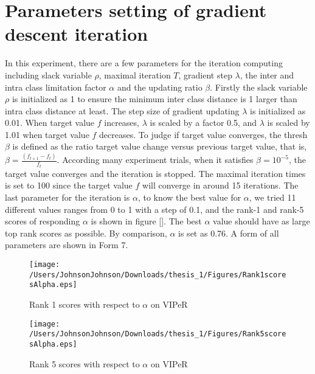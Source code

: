 \section{Parameters setting of gradient descent iteration}
In this experiment, there are a few parameters for the iteration computing including slack variable $\rho$, maximal iteration $T$, gradient step $\lambda$, the inter and intra class limitation factor $\alpha$ and the updating ratio $\beta$. Firstly the slack variable $\rho$ is initialized as 1 to ensure the minimum inter class distance is 1 larger than intra class distance at least. The step size of gradient updating $\lambda$ is initialized as 0.01. When target value $f$ increases,  $\lambda$ is scaled by a factor 0.5, and  $\lambda$ is scaled by 1.01 when target value $f$ decreases. To judge if target value converges, the thresh $\beta$ is defined as the ratio target value change versus previous target value, that is, $\beta = \frac{(f_{t+1}-f_t)}{f_t}$. According many experiment trials, when it satisfies $\beta = 10^{-5}$, the target value converges and the iteration is stopped. The maximal iteration times is set to 100 since the target value $f$ will converge in around 15 iterations.  The last parameter for the iteration is $\alpha$, to know the best value for $\alpha$, we tried 11 different values ranges from 0 to 1 with a step of 0.1, and the rank-1 and rank-5 scores of responding $\alpha$ is shown in figure []. The best $\alpha$ value should have as large top rank scores as possible. By comparison, $\alpha$ is set as 0.76. A form of all parameters are shown in Form 7.
\begin{figure}[H]
\begin{raggedleft}
\texttt{[image: /Users/JohnsonJohnson/Downloads/thesis\_1/Figures/Rank1scoresAlpha.eps]}
\vspace{-3em}
\caption{Rank 1 scores with respect to $\alpha$ on VIPeR}
\end{raggedleft}
\end{figure}
\begin{figure}[H]
\begin{raggedleft}
\texttt{[image: /Users/JohnsonJohnson/Downloads/thesis\_1/Figures/Rank5scoresAlpha.eps]}
\vspace{-3em}
\caption{Rank 5 scores with respect to $\alpha$ on VIPeR}
\end{raggedleft}
\end{figure}


